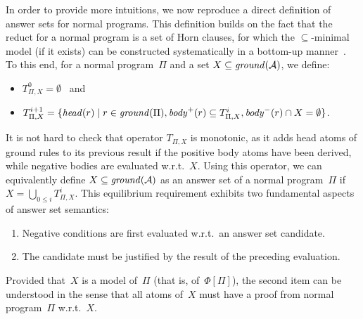 In order to provide more intuitions,
we now reproduce a direct definition of answer sets for normal programs.
This definition builds on the fact that the reduct for a normal program
is a set of Horn clauses, for which the $\subseteq$-minimal model (if it exists) can be constructed
systematically in a bottom-up manner~\cite{dowgal84a}.
To this end, for a normal program~$\Pi$ and a set $X\subseteq\mathit{ground}(\mathcal{A})$,
we define:
\begin{itemize}
\item $T^0_{\Pi,X} = \emptyset$ ~and
\item $T^{i+1}_{\Pi,X} = \{\mathit{head}(r) \mid 
                        r\in\mathit{ground}(\Pi),
                        \mathit{body}^+(r)\subseteq T^i_{\Pi,X},
                        \mathit{body}^-(r)\cap X=\emptyset\}$.
\end{itemize}
It is not hard to check that operator $T_{\Pi,X}$ is monotonic,
as it adds head atoms of ground rules to its previous result if the positive
body atoms have been derived,
while negative bodies are evaluated w.r.t.~$X$.
Using this operator, we can equivalently define $X\subseteq\mathit{ground}(\mathcal{A})$
as an answer set of a normal program~$\Pi$ if $X=\bigcup_{0\leq i}T^i_{\Pi,X}$.
This equilibrium requirement exhibits two fundamental aspects of answer set semantics:
\begin{enumerate}
\item Negative conditions are first evaluated w.r.t.\ an answer set candidate.
\item The candidate must be justified by the result of the preceding evaluation.
\end{enumerate}
Provided that~$X$ is a model of~$\Pi$ (that is, of~$\Phi[\Pi]$),
the second item can be understood in the sense that all atoms of~$X$
must have a proof from normal program~$\Pi$ w.r.t.~$X$.

